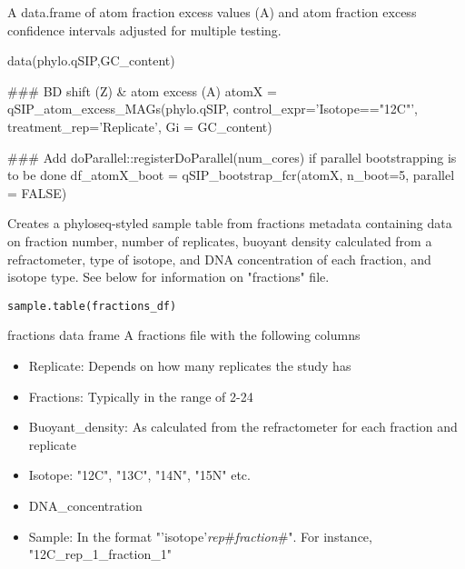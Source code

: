 \documentclass[a4paper]{book}
\begin{document}
%
\begin{Value}
A data.frame of atom fraction excess values (A) and atom fraction excess confidence intervals adjusted for multiple testing.
\end{Value}
%
\begin{Examples}
\begin{ExampleCode}
data(phylo.qSIP,GC_content)

### BD shift (Z) & atom excess (A)
atomX = qSIP_atom_excess_MAGs(phylo.qSIP,
                        control_expr='Isotope=="12C"',
                        treatment_rep='Replicate', Gi = GC_content)

### Add doParallel::registerDoParallel(num_cores) if parallel bootstrapping is to be done
df_atomX_boot = qSIP_bootstrap_fcr(atomX, n_boot=5, parallel = FALSE)


\end{ExampleCode}
\end{Examples}
%
\begin{Description}\relax
Creates a phyloseq-styled sample table from fractions metadata
containing data on fraction number, number of replicates, buoyant density
calculated from a refractometer, type of isotope, and DNA concentration
of each fraction, and isotope type. See below for information on "fractions" file.
\end{Description}
%
\begin{Usage}
\begin{verbatim}
sample.table(fractions_df)
\end{verbatim}
\end{Usage}
%
\begin{Arguments}
\begin{ldescription}
\item[\code{fractions\_df}] fractions data frame
A fractions file with the following columns
\begin{itemize}

\item{} Replicate: Depends on how many replicates the study has
\item{} Fractions: Typically in the range of 2-24
\item{} Buoyant\_density: As calculated from the refractometer for each fraction and replicate
\item{} Isotope: "12C", "13C", "14N", "15N" etc.
\item{} DNA\_concentration
\item{} Sample: In the format "'isotope'\emph{rep}\#\emph{fraction}\#".
For instance, "12C\_rep\_1\_fraction\_1"

\end{itemize}

\end{ldescription}
\end{Arguments}
\end{document}
